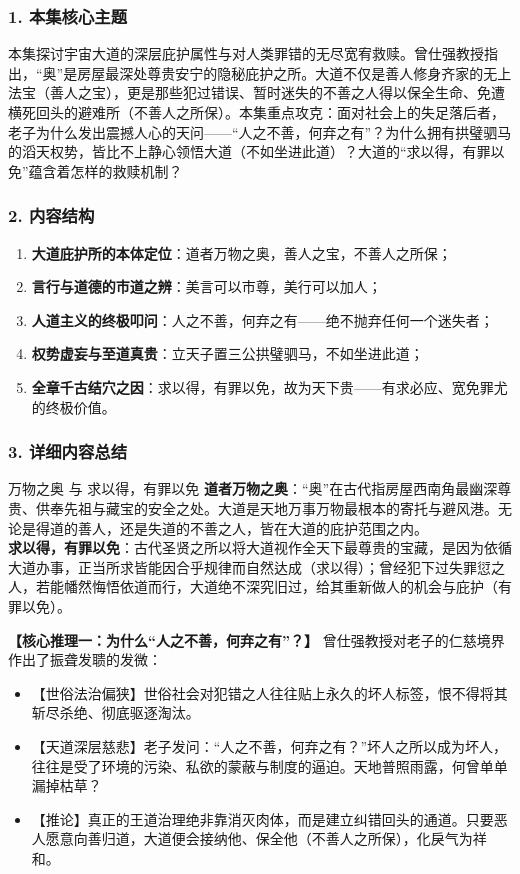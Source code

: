 \subsubsection{1. 本集核心主题}
本集探讨宇宙大道的深层庇护属性与对人类罪错的无尽宽宥救赎。曾仕强教授指出，“奥”是房屋最深处尊贵安宁的隐秘庇护之所。大道不仅是善人修身齐家的无上法宝（善人之宝），更是那些犯过错误、暂时迷失的不善之人得以保全生命、免遭横死回头的避难所（不善人之所保）。本集重点攻克：面对社会上的失足落后者，老子为什么发出震撼人心的天问——“人之不善，何弃之有”？为什么拥有拱璧驷马的滔天权势，皆比不上静心领悟大道（不如坐进此道）？大道的“求以得，有罪以免”蕴含着怎样的救赎机制？

\subsubsection{2. 内容结构}
\begin{enumerate}
    \item \textbf{大道庇护所的本体定位}：道者万物之奥，善人之宝，不善人之所保；
    \item \textbf{言行与道德的市道之辨}：美言可以市尊，美行可以加人；
    \item \textbf{人道主义的终极叩问}：人之不善，何弃之有——绝不抛弃任何一个迷失者；
    \item \textbf{权势虚妄与至道真贵}：立天子置三公拱璧驷马，不如坐进此道；
    \item \textbf{全章千古结穴之因}：求以得，有罪以免，故为天下贵——有求必应、宽免罪尤的终极价值。
\end{enumerate}

\subsubsection{3. 详细内容总结}

\begin{ConceptBox}{万物之奥 与 求以得，有罪以免}
\textbf{道者万物之奥}：“奥”在古代指房屋西南角最幽深尊贵、供奉先祖与藏宝的安全之处。大道是天地万事万物最根本的寄托与避风港。无论是得道的善人，还是失道的不善之人，皆在大道的庇护范围之内。\\
\textbf{求以得，有罪以免}：古代圣贤之所以将大道视作全天下最尊贵的宝藏，是因为依循大道办事，正当所求皆能因合乎规律而自然达成（求以得）；曾经犯下过失罪愆之人，若能幡然悔悟依道而行，大道绝不深究旧过，给其重新做人的机会与庇护（有罪以免）。
\end{ConceptBox}

\noindent\textbf{【核心推理一：为什么“人之不善，何弃之有”？】}
曾仕强教授对老子的仁慈境界作出了振聋发聩的发微：
\begin{itemize}
    \item 【世俗法治偏狭】世俗社会对犯错之人往往贴上永久的坏人标签，恨不得将其斩尽杀绝、彻底驱逐淘汰。
    \item 【天道深层慈悲】老子发问：“人之不善，何弃之有？”坏人之所以成为坏人，往往是受了环境的污染、私欲的蒙蔽与制度的逼迫。天地普照雨露，何曾单单漏掉枯草？
    \item 【推论】真正的王道治理绝非靠消灭肉体，而是建立纠错回头的通道。只要恶人愿意向善归道，大道便会接纳他、保全他（不善人之所保），化戾气为祥和。
\end{itemize}

